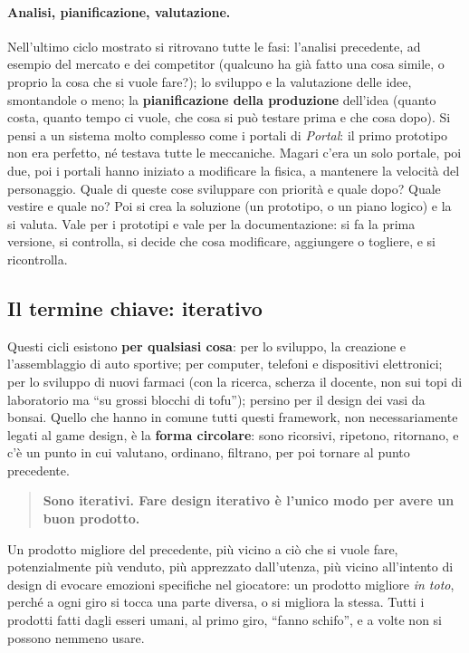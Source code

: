 \paragraph{Analisi, pianificazione, valutazione.} Nell'ultimo ciclo mostrato
si ritrovano tutte le fasi: l'analisi precedente, ad esempio del mercato e dei
competitor (qualcuno ha già fatto una cosa simile, o proprio la cosa che si
vuole fare?); lo sviluppo e la valutazione delle idee, smontandole o meno; la
\textbf{pianificazione della produzione} dell'idea (quanto costa, quanto tempo
ci vuole, che cosa si può testare prima e che cosa dopo). Si pensi a un
sistema molto complesso come i portali di \emph{Portal}: il primo prototipo
non era perfetto, né testava tutte le meccaniche. Magari c'era un solo
portale, poi due, poi i portali hanno iniziato a modificare la fisica, a
mantenere la velocità del personaggio. Quale di queste cose sviluppare con
priorità e quale dopo? Quale vestire e quale no? Poi si crea la soluzione (un
prototipo, o un piano logico) e la si valuta. Vale per i prototipi e vale per
la documentazione: si fa la prima versione, si controlla, si decide che cosa
modificare, aggiungere o togliere, e si ricontrolla.

\subsection{Il termine chiave: iterativo}



Questi cicli esistono \textbf{per qualsiasi cosa}: per lo sviluppo, la
creazione e l'assemblaggio di auto sportive; per computer, telefoni e
dispositivi elettronici; per lo sviluppo di nuovi farmaci (con la ricerca,
scherza il docente, non sui topi di laboratorio ma ``su grossi blocchi di
tofu''); persino per il design dei vasi da bonsai. Quello che hanno in comune
tutti questi framework, non necessariamente legati al game design, è la
\textbf{forma circolare}: sono ricorsivi, ripetono, ritornano, e c'è un punto
in cui valutano, ordinano, filtrano, per poi tornare al punto precedente.

\begin{quote}
\centering
\textbf{Sono iterativi. Fare design iterativo è l'unico modo per avere un buon
prodotto.}
\end{quote}

Un prodotto migliore del precedente, più vicino a ciò che si vuole fare,
potenzialmente più venduto, più apprezzato dall'utenza, più vicino
all'intento di design di evocare emozioni specifiche nel giocatore: un
prodotto migliore \emph{in toto}, perché a ogni giro si tocca una parte
diversa, o si migliora la stessa. Tutti i prodotti fatti dagli esseri umani,
al primo giro, ``fanno schifo'', e a volte non si possono nemmeno usare.

